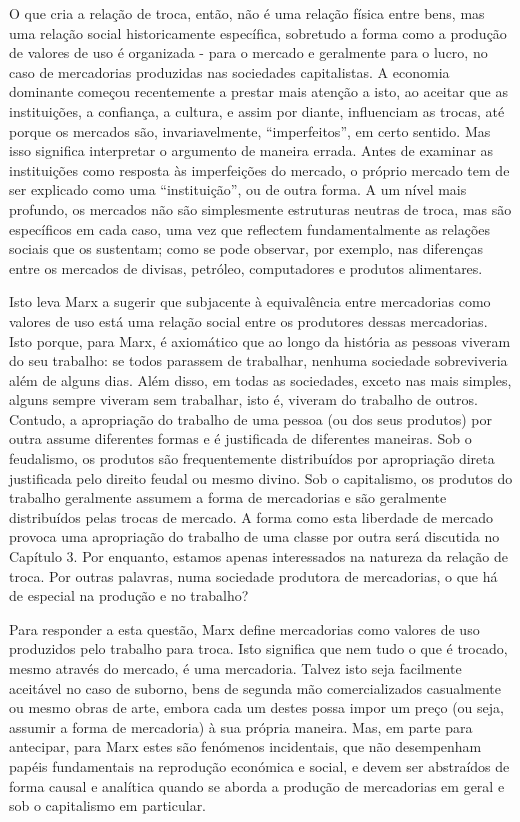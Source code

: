  \par 
O que cria a relação de troca, então, não é uma relação física entre bens, mas uma relação social historicamente específica, sobretudo a forma como a produção de valores de uso é organizada - para o mercado e geralmente para o lucro, no caso de mercadorias produzidas nas sociedades capitalistas. A economia dominante começou recentemente a prestar mais atenção a isto, ao aceitar que as instituições, a confiança, a cultura, e assim por diante, influenciam as trocas, até porque os mercados são, invariavelmente, “imperfeitos”, em certo sentido. Mas isso significa interpretar o argumento de maneira errada. Antes de examinar as instituições como resposta às imperfeições do mercado, o próprio mercado tem de ser explicado como uma “instituição”, ou de outra forma. A um nível mais profundo, os mercados não são simplesmente estruturas neutras de troca, mas são específicos em cada caso, uma vez que reflectem fundamentalmente as relações sociais que os sustentam; como se pode observar, por exemplo, nas diferenças entre os mercados de divisas, petróleo, computadores e produtos alimentares.
 \par 
Isto leva Marx a sugerir que subjacente à equivalência entre mercadorias como valores de uso está uma relação social entre os produtores dessas mercadorias. Isto porque, para Marx, é axiomático que ao longo da história as pessoas viveram do seu trabalho: se todos parassem de trabalhar, nenhuma sociedade sobreviveria além de alguns dias. Além disso, em todas as sociedades, exceto nas mais simples, alguns sempre viveram sem trabalhar, isto é, viveram do trabalho de outros. Contudo, a apropriação do trabalho de uma pessoa (ou dos seus produtos) por outra assume diferentes formas e é justificada de diferentes maneiras. Sob o feudalismo, os produtos são frequentemente distribuídos por apropriação direta justificada pelo direito feudal ou mesmo divino. Sob o capitalismo, os produtos do trabalho geralmente assumem a forma de mercadorias e são geralmente distribuídos pelas trocas de mercado. A forma como esta liberdade de mercado provoca uma apropriação do trabalho de uma classe por outra será discutida no Capítulo {\color{blue}3}. Por enquanto, estamos apenas interessados ​​na natureza da relação de troca. Por outras palavras, numa sociedade produtora de mercadorias, o que há de especial na produção e no trabalho?
 \par 
Para responder a esta questão, Marx define mercadorias como valores de uso produzidos pelo trabalho para troca. Isto significa que nem tudo o que é trocado, mesmo através do mercado, é uma mercadoria. Talvez isto seja facilmente aceitável no caso de suborno, bens de segunda mão comercializados casualmente ou mesmo obras de arte, embora cada um destes possa impor um preço (ou seja, assumir a forma de mercadoria) à sua própria maneira. Mas, em parte para antecipar, para Marx estes são fenómenos incidentais, que não desempenham papéis fundamentais na reprodução económica e social, e devem ser abstraídos de forma causal e analítica quando se aborda a produção de mercadorias em geral e sob o capitalismo em particular.
